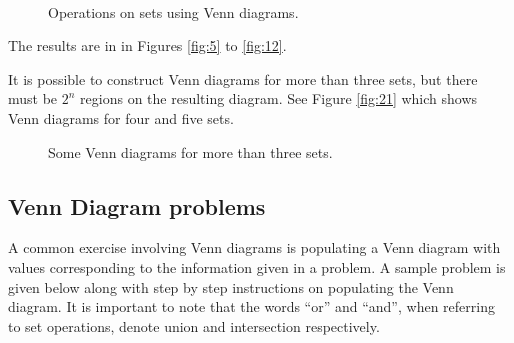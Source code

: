 \begin{figure}[h]
\centering
		\hfil
		\hfil
		\hfil
	\\
		\hfil
		\hfil
		\hfil
		\caption{Operations on sets using Venn diagrams.}
		\label{fig:22}
\end{figure}

The results are in in Figures \eqref{fig:5} to \eqref{fig:12}.

It is possible to construct Venn diagrams for more than three sets, but there must be $2^n$ regions on the resulting diagram. See Figure \eqref{fig:21} which shows Venn diagrams for four and five sets.

\begin{figure}[h]
\centering
		\hfil
		\hfil
		\hfil
		\caption{Some Venn diagrams for more than three sets.}
		\label{fig:21}
\end{figure}

\subsection*{Venn Diagram problems}
A common exercise involving Venn diagrams is populating a Venn diagram with values corresponding to the information given in a problem. A sample problem is given below along with step by step instructions on populating the Venn diagram.
It is important to note that the words “or” and “and”, when referring to set operations, denote union and intersection respectively.


